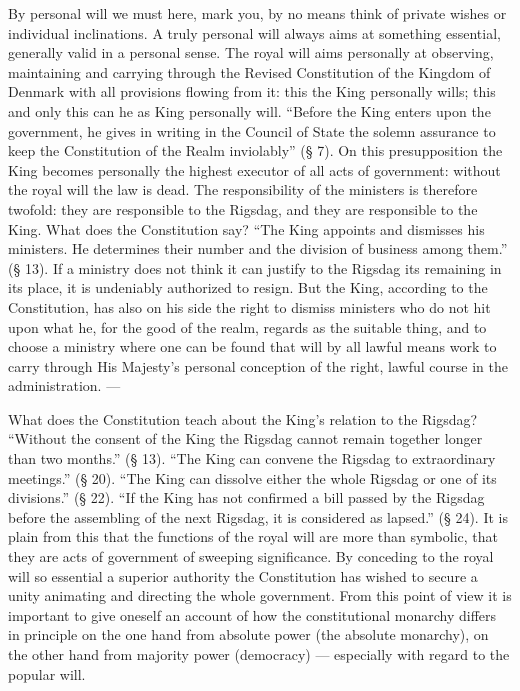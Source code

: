 \documentclass[12pt,a4paper,openany]{book}
\newcommand{\opage}[1]{\marginnote{\footnotesize\textit{[#1]}}}
\begin{document}
By personal will we must here, mark you,
by no means think of private wishes or individual
inclinations. A truly personal will always
aims at something essential, generally valid in a personal sense.
The royal will aims personally at
observing, maintaining and carrying through the Revised Constitution
of the Kingdom of Denmark with all provisions flowing from it:
this the King personally wills; this and
only this can he as King personally will. ``Before
the King enters upon the government, he gives in writing
in the Council of State the solemn assurance to keep the Constitution
of the Realm inviolably'' (§ 7). On this presupposition
the King becomes personally the highest executor of
all acts of government: without the royal will the
law is dead. The responsibility of the ministers is therefore
twofold: they are responsible to the Rigsdag, and they
\setcounter{footnote}{0}%
\opage{11}are responsible to the King. What does the Constitution say?
``The King appoints and dismisses his ministers. He
determines their number and the division of business
among them.'' (§ 13). If a ministry does not think
it can justify to the Rigsdag its remaining in its
place, it is undeniably authorized to resign.
But the King, according to the Constitution, has also on his
side the right to dismiss ministers who do not hit upon
what he, for the good of the realm, regards as the suitable thing,
and to choose a ministry where one can be
found that will by all lawful means work
to carry through His Majesty's personal
conception of the right, lawful course in the administration. ---

What does the Constitution teach about the King's relation to
the Rigsdag? ``Without the consent of the King the Rigsdag cannot
remain together longer than two months.'' (§ 13).
``The King can convene the Rigsdag to extraordinary
meetings.'' (§ 20). ``The King can dissolve
either the whole Rigsdag or one of its divisions.''
(§ 22). ``If the King has not confirmed a bill passed by the Rigsdag
before the assembling of the next Rigsdag,
it is considered as lapsed.'' (§ 24). It is plain
from this that the functions of the royal will are more
than symbolic, that they are acts of government of sweeping
significance. By conceding to the royal will
so essential a superior authority the Constitution has wished
to secure a unity animating and directing the whole government.
From this point of view it is important to give oneself an account of how
the constitutional monarchy differs in principle
on the one hand from absolute power (the
absolute monarchy), on the other hand from
\setcounter{footnote}{0}%
\opage{12}majority power (democracy) --- especially with regard to
the popular will.
\end{document}
